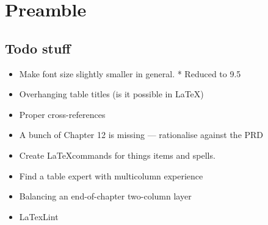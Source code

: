 \chapter*{Preamble}
\section{Todo stuff}
\begin{itemize}
 \item Make font size slightly smaller in general. * Reduced to 9.5
 \item Overhanging table titles (is it possible in \LaTeX )
 \item Proper cross-references
 \item A bunch of Chapter 12 is missing --- rationalise against the PRD
 \item Create \LaTeX commands for things items and spells.
\end{itemize}

\begin{itemize}
 \item Find a table expert with multicolumn experience
 \item Balancing an end-of-chapter two-column layer
 \item LaTexLint
\end{itemize}

